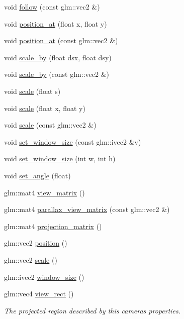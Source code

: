 \begin{DoxyCompactItemize}
void \hyperlink{classpixel_1_1graphics_1_1_camera_adf121c3cfbf7e965902a9e5cd8ec3794}{follow} (const glm\+::vec2 \&)
\item 
void \hyperlink{classpixel_1_1graphics_1_1_camera_aabd436b8a923e4145dea424f6595dac6}{position\+\_\+at} (float x, float y)
\item 
void \hyperlink{classpixel_1_1graphics_1_1_camera_a9fccbd2025aa6e52f2b437a0d6c3cc11}{position\+\_\+at} (const glm\+::vec2 \&)
\item 
void \hyperlink{classpixel_1_1graphics_1_1_camera_ae8aaa7386b997878653f182648922c8b}{scale\+\_\+by} (float dsx, float dsy)
\item 
void \hyperlink{classpixel_1_1graphics_1_1_camera_a97567e83d75e26bad59221066b91e155}{scale\+\_\+by} (const glm\+::vec2 \&)
\item 
void \hyperlink{classpixel_1_1graphics_1_1_camera_a75779ac55f97b633c605bc99ec6c88ce}{scale} (float s)
\item 
void \hyperlink{classpixel_1_1graphics_1_1_camera_a2d8fcc61bcfda9282e98aa70a7e5051e}{scale} (float x, float y)
\item 
void \hyperlink{classpixel_1_1graphics_1_1_camera_a7fb7ac4bb32a9483ea642e25c04bb92d}{scale} (const glm\+::vec2 \&)
\item 
void \hyperlink{classpixel_1_1graphics_1_1_camera_af07358cee9771fc91265eece7f6b9933}{set\+\_\+window\+\_\+size} (const glm\+::ivec2 \&v)
\item 
void \hyperlink{classpixel_1_1graphics_1_1_camera_ae38581a8a649e30b0eaf7ba544573d9f}{set\+\_\+window\+\_\+size} (int w, int h)
\item 
void \hyperlink{classpixel_1_1graphics_1_1_camera_a2932bdf2ad5ca37548a255795d4b0e53}{set\+\_\+angle} (float)
\item 
glm\+::mat4 \hyperlink{classpixel_1_1graphics_1_1_camera_ad89dd217ea5d1ca681006893fabbbd7d}{view\+\_\+matrix} ()
\item 
glm\+::mat4 \hyperlink{classpixel_1_1graphics_1_1_camera_a5da1595f1f65330026cdbde455fa8044}{parallax\+\_\+view\+\_\+matrix} (const glm\+::vec2 \&)
\item 
glm\+::mat4 \hyperlink{classpixel_1_1graphics_1_1_camera_a8f0cc66d5a3312d073ebdc55d0dea94c}{projection\+\_\+matrix} ()
\item 
glm\+::vec2 \hyperlink{classpixel_1_1graphics_1_1_camera_ac4f00fc40a96aba91565fb06999c60d1}{position} ()
\item 
glm\+::vec2 \hyperlink{classpixel_1_1graphics_1_1_camera_ac50d19eb1c15ce69929f7daed2d31aca}{scale} ()
\item 
glm\+::ivec2 \hyperlink{classpixel_1_1graphics_1_1_camera_aa8bad1ecf68611262195b74f42151922}{window\+\_\+size} ()
\item 
glm\+::vec4 \hyperlink{classpixel_1_1graphics_1_1_camera_a6b14915efaefd421f2cafa2cef532d45}{view\+\_\+rect} ()
\begin{DoxyCompactList}\small\item\em The projected region described by this camera\textquotesingle{}s properties. \end{DoxyCompactList}\end{DoxyCompactItemize}
